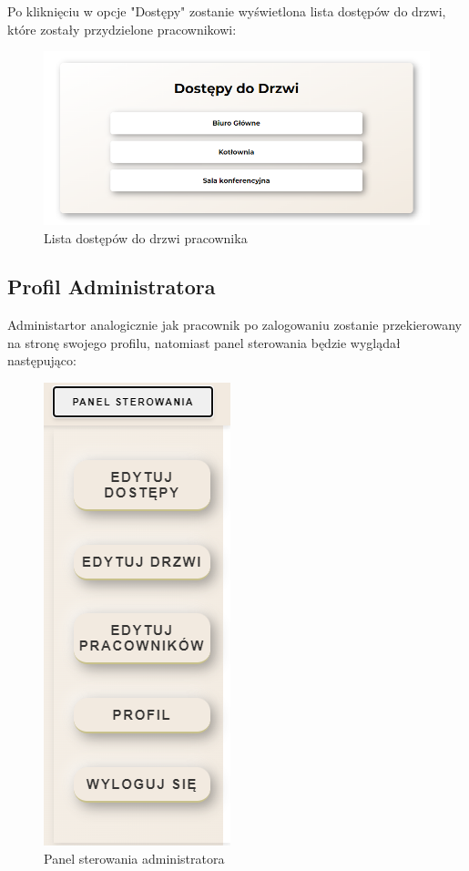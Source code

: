\noindent Po kliknięciu w opcje "Dostępy" zostanie wyświetlona lista dostępów do drzwi, które zostały przydzielone pracownikowi:
\begin{figure}[h]
    \centering
    \includegraphics[scale=0.5]{photos/dostepy_do_drzwi_pracownika.png}
    \caption{Lista dostępów do drzwi pracownika}
    \label{fig:login}
\end{figure}

\subsection{Profil Administratora}
\noindent Administartor analogicznie jak pracownik po zalogowaniu zostanie przekierowany na stronę swojego profilu, 
natomiast panel sterowania będzie wyglądał następująco:
\begin{figure}[h]
    \centering
    \includegraphics[scale=0.6]{photos/panel_sterowania_administratora.png}
    \caption{Panel sterowania administratora}
    \label{fig:login}
\end{figure}


